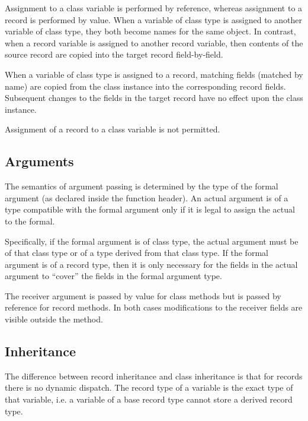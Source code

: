 Assignment to a class variable is performed by reference, whereas assignment to
a record is performed by value.  When a variable of class type is assigned to
another variable of class type, they both become names for the same object.  In
contrast, when a record variable is assigned to another record variable, then
contents of the source record are copied into the target record field-by-field.

When a variable of class type is assigned to a record, matching fields (matched
by name) are copied from the class instance into the corresponding record
fields.  Subsequent changes to the fields in the target record have no effect
upon the class instance.

Assignment of a record to a class variable is not permitted.

\subsection{Arguments}
\label{Argument_Differences}

The semantics of argument passing is determined by the type of the formal
argument (as declared inside the function header).  An actual argument is of a
type compatible with the formal argument only if it is legal to assign the
actual to the formal.

Specifically, if the formal argument is of class type, the actual argument must
be of that class type or of a type derived from that class type.  If the formal
argument is of a record type, then it is only necessary for the fields in the
actual argument to ``cover'' the fields in the formal argument type.

The receiver argument is passed by value for class methods but is
passed by reference for record methods. In both cases modifications to
the receiver fields are visible outside the method.

\subsection{Inheritance}
\label{Inheritance_Differences}

The difference between record inheritance and class
inheritance is that for records there is no dynamic dispatch.  The record type of
a variable is the exact type of that variable, i.e. a variable of a
base record type cannot store a derived record type.

